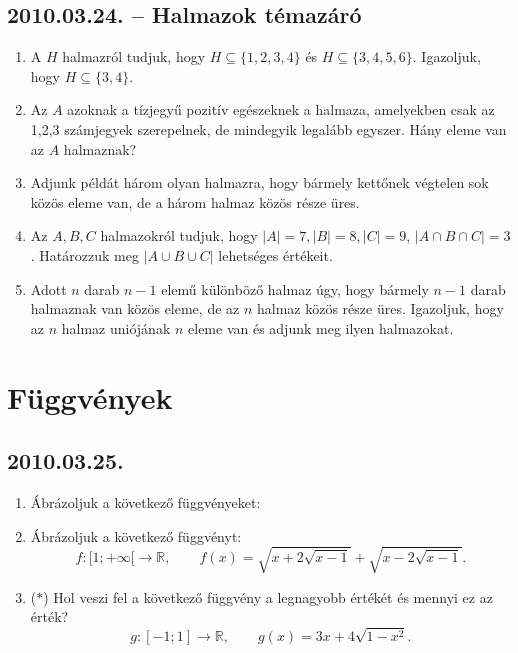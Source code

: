 \subsection*{2010.03.24. -- Halmazok témazáró}
\begin{enumerate}
\item A $H$ halmazról tudjuk, hogy $H\subseteq \{1,2,3,4\}$ és $H\subseteq \{3,4,5,6\}$. Igazoljuk, hogy $H\subseteq \{3,4\}$.
\item Az $A$ azoknak a tízjegyű pozitív egészeknek a halmaza, amelyekben csak az 1,2,3 számjegyek szerepelnek, de mindegyik legalább egyszer. Hány eleme van az $A$ halmaznak?
\item Adjunk példát három olyan halmazra, hogy bármely kettőnek végtelen sok közös eleme van, de a három halmaz közös része üres.
\item Az $A,B,C$ halmazokról tudjuk, hogy $|A|=7, |B|=8, |C|=9$, $|A\cap B \cap C|=3$. Határozzuk meg $|A\cup B \cup C|$ lehetséges értékeit.
\item Adott $n$ darab $n-1$ elemű különböző halmaz úgy, hogy bármely $n-1$ darab halmaznak van közös eleme, de az $n$ halmaz közös része üres. Igazoljuk, hogy az $n$ halmaz uniójának $n$ eleme van és adjunk meg ilyen halmazokat.
\end{enumerate}





\section{Függvények}

\subsection*{2010.03.25.}
\begin{enumerate}
\item Ábrázoljuk a következő függvényeket:
\item Ábrázoljuk a következő függvényt:
$$f:[1;+\infty[\to \mathbb{R},\qquad f(x)=\sqrt{x+2\sqrt{x-1}}+\sqrt{x-2\sqrt{x-1}}.$$
\item ($*$) Hol veszi fel a következő függvény a legnagyobb értékét és mennyi ez az érték?
$$g:[-1;1]\to\mathbb{R},\qquad g(x)=3x+4\sqrt{1-x^2}.$$
\end{enumerate}

